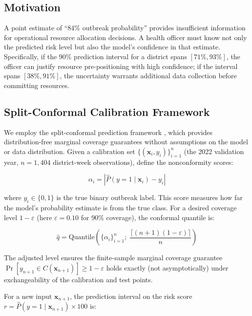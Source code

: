 \documentclass[conference]{IEEEtran}
\begin{document}
\subsection{Motivation}

A point estimate of ``84\% outbreak probability'' provides
insufficient information for operational resource allocation
decisions. A health officer must know not only the predicted risk
level but also the model's confidence in that estimate.
Specifically, if the 90\% prediction interval for a district spans
$[71\%, 93\%]$, the officer can justify resource pre-positioning
with high confidence; if the interval spans $[38\%, 91\%]$, the
uncertainty warrants additional data collection before committing
resources.

\subsection{Split-Conformal Calibration Framework}

We employ the split-conformal prediction framework
\cite{taquet2022mapie}, which provides distribution-free marginal
coverage guarantees without assumptions on the model or data
distribution. Given a calibration set $\{(\mathbf{x}_i, y_i)\}_{i=1}^{n}$
(the 2022 validation year, $n=1{,}404$ district-week observations),
define the nonconformity scores:

\begin{equation}
  \alpha_i = \left|\hat{P}(y=1 \mid \mathbf{x}_i) - y_i\right|
  \label{eq:nonconformity}
\end{equation}

where $y_i \in \{0,1\}$ is the true binary outbreak label.
This score measures how far the model's probability estimate is from
the true class. For a desired coverage level $1-\varepsilon$
(here $\varepsilon = 0.10$ for 90\% coverage), the conformal quantile
is:

\begin{equation}
  \hat{q} = \text{Quantile}\!\left(\{\alpha_i\}_{i=1}^{n};\;
  \frac{\lceil (n+1)(1-\varepsilon) \rceil}{n}\right)
  \label{eq:qhat}
\end{equation}

The adjusted level ensures the finite-sample marginal coverage
guarantee $\Pr[y_{n+1} \in C(\mathbf{x}_{n+1})] \geq 1-\varepsilon$
holds exactly (not asymptotically) under exchangeability of the
calibration and test points.

For a new input $\mathbf{x}_{n+1}$, the prediction interval on the
risk score $r = \hat{P}(y=1 \mid \mathbf{x}_{n+1}) \times 100$ is:
\end{document}
